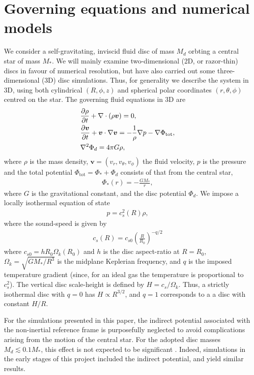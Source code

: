 \section{Governing equations and numerical models}\label{model} 
We consider a self-gravitating, inviscid fluid disc of mass $M_d$ 
orbting a central star of mass $M_*$. We will mainly examine two-dimensional
(2D, or razor-thin) discs in favour of numerical 
resolution, but have also carried out some three-dimensional (3D) disc
simulations. Thus, for generality we describe the system in
3D, using both cylindrical $(R,\phi,z)$ and spherical polar
coordinates $(r,\theta,\phi)$ centred on the star. 
The governing fluid equations in 3D are  
\begin{align}
  &\frac{\partial\rho}{\partial t} + \nabla\cdot\left(\rho\bm{v}\right) =
  0,\label{cont_eq}\\
  &\frac{\partial\bm{v}}{\partial t} + \bm{v}\cdot\nabla\bm{v} = -\frac{1}{\rho}\nabla
  p -\nabla \Phi_\mathrm{tot}\label{mom_eq},\\ 
  & \nabla^2\Phi_d = 4 \pi G \rho \label{poisson}, 
\end{align}
where $\rho$ is the mass density, $\bm{v}=(v_r,v_\theta,v_\phi)$ the
fluid velocity, $p$ is the pressure and the total potential
$\Phi_\mathrm{tot} = \Phi_* + \Phi_d$ consists of that from the
central star, 
\begin{align}
  \Phi_*(r) = -\frac{GM_*}{r}, 
\end{align}
where $G$ is the gravitational constant,  and the disc potential
$\Phi_d$. We impose a locally isothermal equation of state 
\begin{align}
  p = c_s^2(R)\rho,
\end{align}
where the sound-speed is given by 
\begin{align}\label{sound-speed}
  c_s(R) = c_{s0}\left(\frac{R}{R_0}\right)^{-q/2}
\end{align}
where $c_{s0} = h R_0\Omega_k(R_0)$ and 
$h$ is the disc aspect-ratio at $R=R_0$, 
$\Omega_k=\sqrt{GM_*/R^3}$ is the midplane Keplerian frequency, and
$q$ is the imposed temperature gradient (since, for an ideal gas the
temperature is proportional to $c_s^2$). The vertical disc scale-height is
defined by $H=c_s/\Omega_k$. Thus, a strictly isothermal disc with
$q=0$ has $H\propto R^{3/2}$, and $q=1$ corresponds to a 
a disc with constant $H/R$. 

For the simulations presented in this paper, the indirect potential
associated with the non-inertial reference frame is purposefully 
neglected to avoid complications arising from the motion of the
central star. For the adopted disc masses $M_d\lesssim 0.1 M_*$, this
effect is not expected to be significant \citep{adams89,shu90}. Indeed,
simulations in the early stages of this project included the indirect
potential, and yield similar results.  

